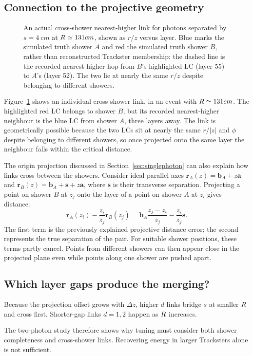 \subsection{Connection to the projective geometry}
\begin{figure}[!tp]
  \centering
  \caption{An actual cross-shower nearest-higher link for photons separated by
  $s=\SI{4}{cm}$ at $R\simeq131 cm$, shown as $r/z$ versus layer. Blue marks the
   simulated truth shower $A$ and red the simulated truth shower $B$, rather
  than reconstructed Trackster membership; the dashed line is the
  recorded nearest-higher hop from $B$'s highlighted LC (layer 55) to $A$'s
  (layer 52). The two lie at nearly the same $r/z$ despite belonging to
  different showers.}
  \label{fig:mergemechanism}
\end{figure}

Figure~\ref{fig:mergemechanism} shows an individual cross-shower link, in an
event with $R\simeq131 cm$. The highlighted red LC belongs to
shower $B$, but its recorded nearest-higher neighbour is the blue LC from
shower $A$, three layers away. The link is geometrically possible because the
two LCs sit at nearly the same $r/|z|$ and $\phi$ despite belonging to different
showers, so once projected onto the same layer the neighbour falls within the
critical distance.

The origin projection discussed in Section~\ref{sec:singlephoton} can also
explain how links cross between the showers. Consider ideal parallel axes
$\mathbf{r}_A(z)=\mathbf{b}_A+z\mathbf{a}$ and
$\mathbf{r}_B(z)=\mathbf{b}_A+\mathbf{s}+z\mathbf{a}$, where
$\mathbf{s}$ is their transverse separation. Projecting a point on shower
$B$ at $z_j$ onto the layer of a point on shower $A$ at $z_i$ gives distance:
\begin{equation}
 \mathbf{r}_A(z_i)-\frac{z_i}{z_j}\mathbf{r}_B(z_j)
 =\mathbf{b}_A\frac{z_j-z_i}{z_j}-\frac{z_i}{z_j}\mathbf{s}.
 \label{eq:crossshowerprojection}
\end{equation}
The first term is the previously explained projective distance error;
the second represents the true separation of the pair. For suitable shower positions, these terms partly cancel. Points from
different showers can then appear close in the projected plane even while
points along one shower are pushed apart.

\subsection{Which layer gaps produce the merging?}

Because the projection offset grows with $\Delta z$, higher $d$ links bridge
$s$ at smaller $R$ and cross first. Shorter-gap links $d=1,2$ happen as $R$ increases.

The two-photon study therefore shows why tuning must consider both shower
completeness and cross-shower links. Recovering energy in larger Tracksters
alone is not sufficient.
